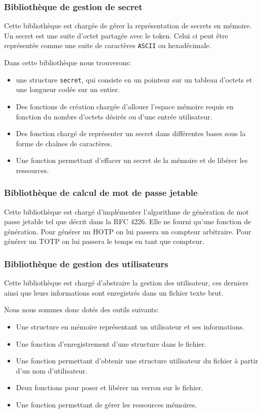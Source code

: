 \subsubsection{Bibliothèque de gestion de secret}
Cette bibliothèque est chargée de gérer la représentation de secrets en mémoire.
Un secret est une suite d'octet partagée avec le token. Celui ci peut être
représentée comme une suite de caractères \verb?ASCII? ou hexadécimale.

Dans cette bibliothèque nous trouverons:
\begin{itemize}
  \item une structure \verb?secret?, qui consiste en un pointeur sur un tableau
  d'octets et une longueur codée sur un entier.
  \item Des fonctions de création chargée d'allouer l'espace mémoire requis en
  fonction du nombre d'octets désirés ou d'une entrée utilisateur.
  \item Des fonction chargé de représenter un secret dans différentes bases
  sous la forme de chaînes de caractères.
  \item Une fonction permettant d'effacer un secret de la mémoire et de
  libérer les ressources.
\end{itemize}

\subsubsection{Bibliothèque de calcul de mot de passe jetable}
Cette bibliothèque est chargé d'implémenter l'algorithme de génération de mot
passe jetable tel que décrit dans la RFC 4226\cite{HOTPrfc}. Elle ne fourni
qu'une fonction de génération. Pour générer un HOTP on lui passera un compteur
arbitraire. Pour générer un TOTP on lui passera le temps en tant que compteur.

\subsubsection{Bibliothèque de gestion des utilisateurs}
Cette bibliothèque est chargé d'abstraire la gestion des utilisateur, ces
derniers ainsi que leurs informations sont enregistrés dans un fichier texte
brut.

Nous nous sommes donc dotés des outils suivants:
\begin{itemize}
  \item Une structure en mémoire représentant un utilisateur et ses
  informations.
  \item Une fonction d'enregistrement d'une structure dans le fichier.
  \item Une fonction permettant d'obtenir une structure utilisateur du fichier
  à partir d'un nom d'utilisateur.
  \item Deux fonctions pour poser et libérer un verrou sur le fichier.
  \item Une fonction permettant de gérer les ressources mémoires.\\
\end{itemize}

